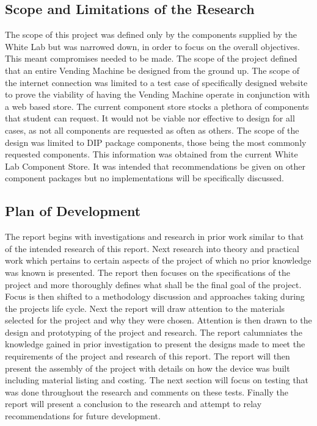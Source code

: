 \documentclass[a4paper,11pt]{article}
\numberwithin{figure}{section}
\numberwithin{table}{section}
\begin{document}
	\subsection{Scope and Limitations of the Research}
The scope of this project was defined only by the components supplied by the White Lab but was narrowed down, in order to focus on the overall objectives. This meant compromises needed to be made. The scope of the project defined that an entire Vending Machine be designed from the ground up. The scope of the internet connection was limited to a test case of specifically designed website to prove the viability of having the Vending Machine operate in conjunction with a web based store. The current component store stocks a plethora of components that student can request. It would not be viable nor effective to design for all cases, as not all components are requested as often as others. The scope of the design was limited to DIP package components, those being the most commonly requested components. This information was obtained from the current White Lab Component Store. It was intended that recommendations be given on other component packages but no implementations will be specifically discussed. 
	\subsection{Plan of Development}	
The report begins with investigations and research in prior work similar to that of the intended research of this report. Next research into theory and practical work which pertains to certain aspects of the project of which no prior knowledge was known is presented. The report then focuses on the specifications of the project and more thoroughly defines what shall be the final goal of the project. Focus is then shifted to a methodology discussion and approaches taking during the projects life cycle. Next the report will draw attention to the materials selected for the project and why they were chosen. Attention is then drawn to the design and prototyping of the project and research. The report calumniates the knowledge gained in prior investigation to present the designs made to meet the requirements of the project and research of this report. The report will then present the assembly of the project with details on how the device was built including material listing and costing. The next section will focus on testing that was done throughout the research and comments on these tests. Finally the report will present a conclusion to the research and attempt to relay recommendations for future development.
\end{document}
